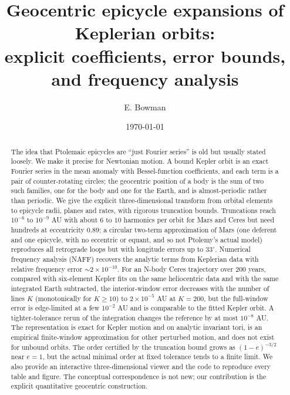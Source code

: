 \documentclass[aps,pra,reprint,amsmath,amssymb,superscriptaddress,nofootinbib]{revtex4-2}
\theoremstyle{plain}
\begin{document}
\title{Geocentric epicycle expansions of Keplerian orbits:\\
explicit coefficients, error bounds, and frequency analysis}

\author{E. Bowman}

\date{\today}

\begin{abstract}
The idea that Ptolemaic epicycles are ``just Fourier series'' is old but usually stated loosely. We make it precise for Newtonian motion. A bound Kepler orbit is an exact Fourier series in the mean anomaly with Bessel-function coefficients, and each term is a pair of counter-rotating circles; the geocentric position of a body is the sum of two such families, one for the body and one for the Earth, and is almost-periodic rather than periodic. We give the explicit three-dimensional transform from orbital elements to epicycle radii, planes and rates, with rigorous truncation bounds. Truncations reach $10^{-6}$ to $10^{-9}$ AU with about $6$ to $10$ harmonics per orbit for Mars and Ceres but need hundreds at eccentricity $0.89$; a circular two-term approximation of Mars (one deferent and one epicycle, with no eccentric or equant, and so not Ptolemy's actual model) reproduces all retrograde loops but with longitude errors up to $33^\circ$. Numerical frequency analysis (NAFF) recovers the analytic terms from Keplerian data with relative frequency error $\sim2\times10^{-10}$. For an N-body Ceres trajectory over $200$ years, compared with six-element Kepler fits on the same heliocentric data and with the same integrated Earth subtracted, the interior-window error decreases with the number of lines $K$ (monotonically for $K\ge10$) to $2\times10^{-5}$ AU at $K=200$, but the full-window error is edge-limited at a few $10^{-2}$ AU and is comparable to the fitted Kepler orbit. A tighter-tolerance rerun of the integration changes the reference by at most $10^{-8}$ AU. The representation is exact for Kepler motion and on analytic invariant tori, is an empirical finite-window approximation for other perturbed motion, and does not exist for unbound orbits. The order certified by the truncation bound grows as $(1-e)^{-3/2}$ near $e=1$, but the actual minimal order at fixed tolerance tends to a finite limit. We also provide an interactive three-dimensional viewer and the code to reproduce every table and figure. The conceptual correspondence is not new; our contribution is the explicit quantitative geocentric construction.
\end{abstract}
\end{document}
